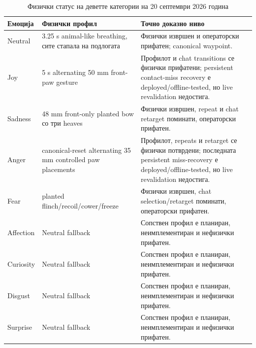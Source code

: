 \begin{table}[htbp]
\centering
\caption{Физички статус на деветте категории на 20 септември 2026 година}
\label{tab:physical-emotions}
\small
\begin{tabularx}{\textwidth}{L{0.13\textwidth}YL{0.31\textwidth}}
\toprule
\textbf{Емоција} & \textbf{Физички профил} & \textbf{Точно доказно ниво} \\
\midrule
Neutral & 3.25 s animal-like breathing, сите стапала на подлогата & Физички извршен и операторски прифатен; canonical waypoint. \\
Joy & 5 s alternating 50 mm front-paw gesture & Профилот и chat transitions се физички прифатени; persistent contact-miss recovery е deployed/offline-tested, но live revalidation недостига. \\
Sadness & 48 mm front-only planted bow со три heaves & Физички извршен, repeat и chat retarget поминати, операторски прифатен. \\
Anger & canonical-reset alternating 35 mm controlled paw placements & Профилот, repeats и retarget се физички потврдени; последната persistent miss-recovery е deployed/offline-tested, но live revalidation недостига. \\
Fear & planted flinch/recoil/cower/freeze & Физички извршен, chat selection/retarget поминати, операторски прифатен. \\
Affection & Neutral fallback & Сопствен профил е планиран, неимплементиран и нефизички прифатен. \\
Curiosity & Neutral fallback & Сопствен профил е планиран, неимплементиран и нефизички прифатен. \\
Disgust & Neutral fallback & Сопствен профил е планиран, неимплементиран и нефизички прифатен. \\
Surprise & Neutral fallback & Сопствен профил е планиран, неимплементиран и нефизички прифатен. \\
\bottomrule
\end{tabularx}
\end{table}

